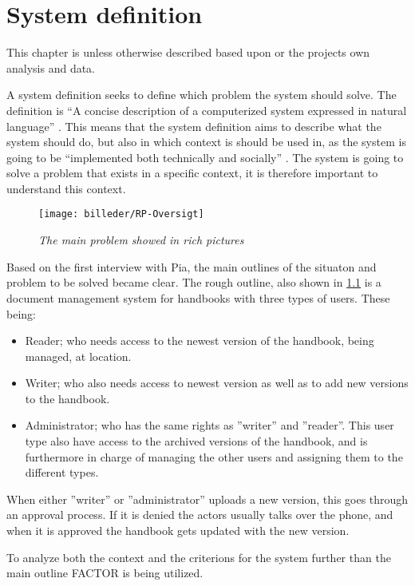 \chapter{System definition}
This chapter is unless otherwise described based upon \cite{Rod-Aalborg} or the projects own analysis and data.

A system definition seeks to define which problem the system should solve. 
The definition is “A concise description of a computerized system expressed in natural language” \citep[p.~24]{Rod-Aalborg}. 
This means that the system definition aims to describe what the system should do, but also in which context is should be used in, as the system is going to be “implemented both technically and socially” \citep[p.~23]{Rod-Aalborg}. 
The system is going to solve a problem that exists in a specific context, it is therefore important to understand this context.

\begin{figure}[H]
	\centering
	\texttt{[image: billeder/RP-Oversigt]}
	\caption{\textit{The main problem showed in rich pictures
	}}
	\label{fig:RP-Oversigt}
\end{figure}

Based on the first interview with Pia, the main outlines of the situaton and problem to be solved became clear.
The rough outline, also shown in \cref{fig:RP-Oversigt} is a document management system for handbooks with three types of users. These being: 
\begin{itemize}
	\item 
	 Reader; who needs access to the newest version of the handbook, being managed, at location.
	\item 
	 Writer; who also needs access to newest version as well as to add new versions to the handbook.
	\item 
	 Administrator; who has the same rights as ''writer'' and ''reader''.
	 This user type also have access to the archived versions of the handbook, and is furthermore in charge of managing the other users and assigning them to the different types.
\end{itemize}
When either ''writer'' or ''administrator'' uploads a new version, this goes through an approval process.
If it is denied the actors usually talks over the phone, and when it is approved the handbook gets updated with the new version.

To analyze both the context and the criterions for the system further than the main outline FACTOR is being utilized.

